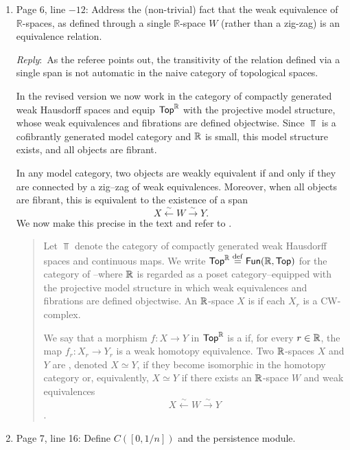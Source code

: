 \documentclass{amsart}
\newcommand{\ar}{\medskip\noindent\textit{Reply}:\ }
\begin{document}
	\begin{enumerate}
		\item Page 6, line $-12$: Address the (non-trivial) fact that the weak equivalence of $\mathbb{R}$-spaces, as defined through a single $\mathbb{R}$-space $W$ (rather than a zig-zag) is an equivalence relation.

		\ar As the referee points out, the transitivity of the relation defined via a single span is not automatic in the naive category of topological spaces.

		In the revised version we now work in the category of compactly generated weak Hausdorff spaces and equip $\mathsf{Top}^{\mathbb{R}}$ with the projective model structure, whose weak equivalences and fibrations are defined objectwise. Since $\Top$ is a cofibrantly generated model category and $\mathbb{R}$ is small, this model structure exists, and all objects are fibrant.

		In any model category, two objects are weakly equivalent if and only if they are connected by a zig--zag of weak equivalences. Moreover, when all objects are fibrant, this is equivalent to the existence of a span
		\[
		X \xleftarrow{\sim} W \xrightarrow{\sim} Y.
		\]
		We now make this precise in the text and refer to \cite[\S2.4]{blumberg2023interleaving}.

		\medskip
		\begin{quote}
			Let $\Top$ denote the category of compactly generated weak Hausdorff spaces and continuous maps.
			We write $\mathsf{Top}^{\mathbb{R}} \stackrel{\mathrm{def}}{=} \mathsf{Fun}(\mathbb{R},\mathsf{Top})$ for the category of --where $\mathbb{R}$ is regarded as a poset category--equipped with the projective model structure in which weak equivalences and fibrations are defined objectwise.
			An $\mathbb{R}$-space $X$ is  if each $X_r$ is a CW-complex.

			We say that a morphism $f \colon X \to Y$ in $\mathsf{Top}^{\mathbb{R}}$ is a  if, for every $r \in \mathbb{R}$, the map $f_r \colon X_r \to Y_r$ is a weak homotopy equivalence.
			Two $\mathbb{R}$-spaces $X$ and $Y$ are , denoted $X \simeq Y$, if they become isomorphic in the homotopy category or, equivalently, $X \simeq Y$ if there exists an $\mathbb{R}$-space $W$ and weak equivalences
			\[
			X \xleftarrow{\ \sim\ } W \xrightarrow{\ \sim\ } Y
			\]
			\cite[\S2.4]{blumberg2023interleaving}.
		\end{quote}

		\item Page 7, line 16: Define $C([0, 1/n])$ and the persistence module.


\end{enumerate}
\end{document}
